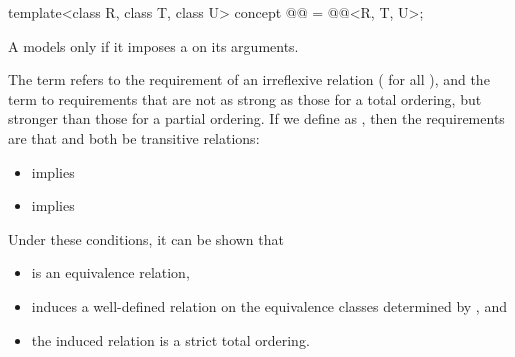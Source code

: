 \begin{itemdecl}
template<class R, class T, class U>
  concept @@ = @@<R, T, U>;
\end{itemdecl}

\begin{itemdescr}
\pnum
A  models  only if
it imposes a  on its arguments.

\pnum
The term
refers to the
requirement of an irreflexive relation ( for all ),
and the term
to requirements that are not as strong as
those for a total ordering,
but stronger than those for a partial
ordering.
If we define
as
,
then the requirements are that
and
both be transitive relations:
\begin{itemize}
\item
{}
implies
\item
{}
implies
\end{itemize}

\pnum
\begin{note}
Under these conditions, it can be shown that
\begin{itemize}
\item
{}
is an equivalence relation,
\item
{}
induces a well-defined relation on the equivalence
classes determined by
, and
\item
the induced relation is a strict total ordering.
\end{itemize}
\end{note}
\end{itemdescr}
